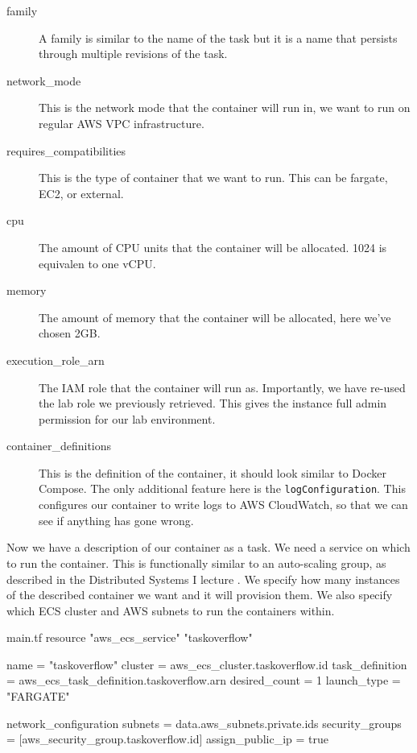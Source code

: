 \documentclass{csse4400}
\begin{document}
\begin{description}
    \item[family] A family is similar to the name of the task but it is a name that persists through multiple revisions of the task.
    \item[network\_mode] This is the network mode that the container will run in, we want to run on regular AWS VPC infrastructure.
    \item[requires\_compatibilities] This is the type of container that we want to run. This can be fargate, EC2, or external.
    \item[cpu] The amount of CPU units that the container will be allocated. 1024 is equivalen to one vCPU.
    \item[memory] The amount of memory that the container will be allocated, here we've chosen 2GB.
    \item[execution\_role\_arn] The IAM role that the container will run as.
        Importantly, we have re-used the lab role we previously retrieved.
        This gives the instance full admin permission for our lab environment.
    \item[container\_definitions] This is the definition of the container, it should look similar to Docker Compose.
        The only additional feature here is the \texttt{logConfiguration}.
        This configures our container to write logs to AWS CloudWatch, so that we can see if anything has gone wrong.
\end{description}

Now we have a description of our container as a task.
We need a service on which to run the container.
This is functionally similar to an auto-scaling group, as described in the Distributed Systems I lecture \cite{distributed1-slides}.
We specify how many instances of the described container we want and it will provision them.
We also specify which ECS cluster and AWS subnets to run the containers within.

\begin{code}[language=terraform,numbers=none]{main.tf}
resource "aws_ecs_service" "taskoverflow" {
    name            = "taskoverflow"
    cluster         = aws_ecs_cluster.taskoverflow.id
    task_definition = aws_ecs_task_definition.taskoverflow.arn
    desired_count   = 1
    launch_type     = "FARGATE"
  
    network_configuration {
      subnets             = data.aws_subnets.private.ids
      security_groups     = [aws_security_group.taskoverflow.id]
      assign_public_ip    = true
    }
}
\end{code}
\end{document}
